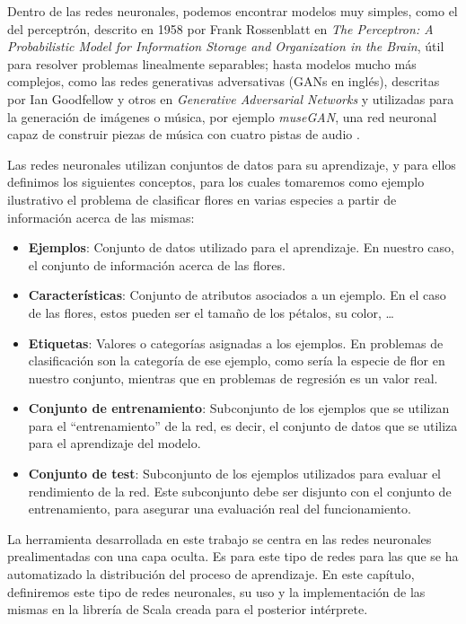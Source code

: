\vspace{10pt}
Dentro de las redes neuronales, podemos encontrar modelos muy simples, como el del perceptrón, descrito en 1958 por 
Frank Rossenblatt en 
\textit{The Perceptron: A Probabilistic Model for Information Storage and Organization in the Brain}, útil para 
resolver problemas linealmente separables; hasta modelos mucho más complejos, como las redes generativas adversativas 
(GANs en inglés), descritas por Ian Goodfellow y otros en \textit{Generative Adversarial Networks} y utilizadas para la 
generación de imágenes o música, por ejemplo \textit{museGAN}, una red neuronal capaz de construir piezas de música con 
cuatro pistas de audio \cite{dong_hsiao_yang_yang_2018}.

\vspace{10pt}
Las redes neuronales utilizan conjuntos de datos para su aprendizaje, y para ellos definimos los siguientes conceptos, 
para los cuales tomaremos como ejemplo ilustrativo el problema de clasificar flores en varias especies a partir de 
información acerca de las mismas:

\begin{itemize}
    \item \textbf{Ejemplos}: Conjunto de datos utilizado para el aprendizaje. En nuestro caso, el conjunto de 
    información acerca de las flores.
    \item \textbf{Características}: Conjunto de atributos asociados a un ejemplo. En el caso de las flores, estos
    pueden ser el tamaño de los pétalos, su color, \dots
    \item \textbf{Etiquetas}: Valores o categorías asignadas a los ejemplos. En problemas de clasificación son la
    categoría de ese ejemplo, como sería la especie de flor en nuestro conjunto, mientras que en problemas de regresión
    es un valor real.
    \item \textbf{Conjunto de entrenamiento}: Subconjunto de los ejemplos que se utilizan para el ``entrenamiento'' de
    la red, es decir, el conjunto de datos que se utiliza para el aprendizaje del modelo.
    \item \textbf{Conjunto de test}: Subconjunto de los ejemplos utilizados para evaluar el rendimiento de la red. Este
    subconjunto debe ser disjunto con el conjunto de entrenamiento, para asegurar una evaluación real del 
    funcionamiento.
\end{itemize}

\vspace{10pt}
La herramienta desarrollada en este trabajo se centra en las redes neuronales prealimentadas con una capa oculta. Es 
para este tipo de redes para las que se ha automatizado la distribución del proceso de aprendizaje. En este capítulo, 
definiremos este tipo de redes neuronales, su uso y la implementación de las mismas en la librería de Scala creada para
el posterior intérprete.

